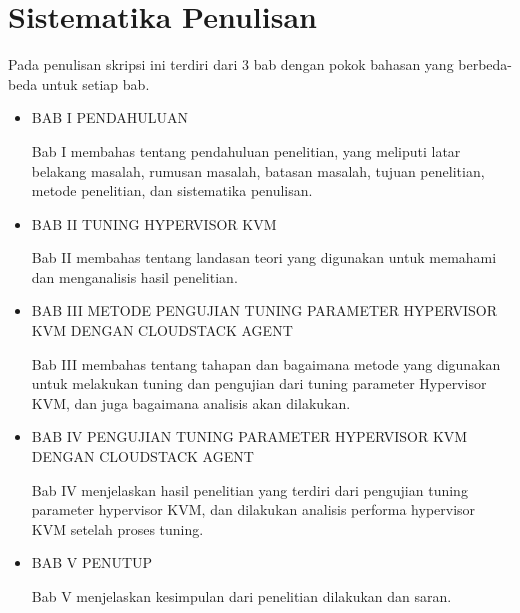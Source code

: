\section{Sistematika Penulisan}
Pada penulisan skripsi ini terdiri dari 3 bab dengan pokok bahasan yang berbeda-beda untuk setiap bab.
\begin{itemize}
      \item BAB I PENDAHULUAN

            Bab I membahas tentang pendahuluan penelitian, yang meliputi latar belakang masalah, rumusan masalah, batasan masalah, tujuan penelitian, metode penelitian, dan sistematika penulisan.

      \item BAB II TUNING HYPERVISOR KVM

            Bab II membahas tentang landasan teori yang digunakan untuk memahami dan menganalisis hasil penelitian.

      \item BAB III METODE PENGUJIAN TUNING PARAMETER HYPERVISOR KVM DENGAN CLOUDSTACK AGENT

            Bab III membahas tentang tahapan dan bagaimana metode yang digunakan untuk melakukan tuning dan pengujian dari tuning parameter Hypervisor KVM, dan juga bagaimana analisis akan dilakukan.

      \item BAB IV PENGUJIAN TUNING PARAMETER HYPERVISOR KVM DENGAN CLOUDSTACK AGENT

            Bab IV menjelaskan hasil penelitian yang terdiri dari pengujian tuning parameter hypervisor KVM, dan dilakukan analisis performa hypervisor KVM setelah proses tuning.

      \item BAB V PENUTUP

            Bab V menjelaskan kesimpulan dari penelitian dilakukan dan saran.
\end{itemize}